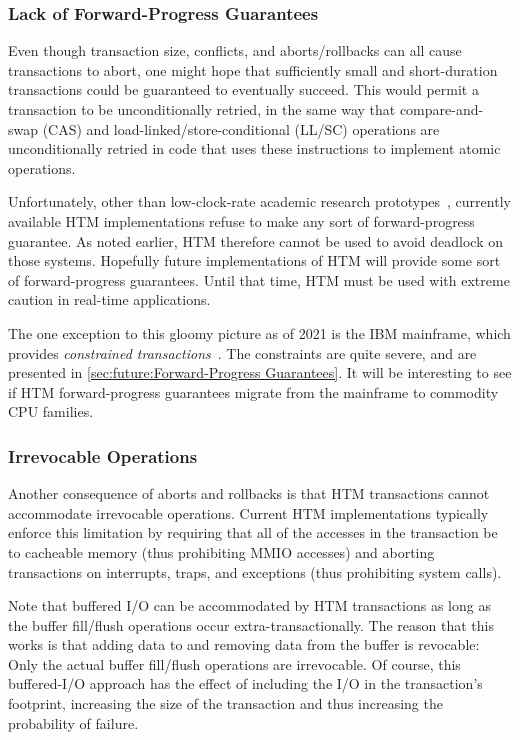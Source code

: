 \subsubsection{Lack of Forward-Progress Guarantees}
\label{sec:future:Lack of Forward-Progress Guarantees}

Even though transaction size, conflicts, and aborts/rollbacks can all
cause transactions to abort, one might hope that sufficiently small and
short-duration transactions could be guaranteed to eventually succeed.
This would permit a transaction to be unconditionally retried, in the
same way that compare-and-swap (CAS) and load-linked/store-conditional
(LL/SC) operations are unconditionally retried in code that uses these
instructions to implement atomic operations.

Unfortunately, other than low-clock-rate academic research
prototypes~\cite{MartinSchoeberl2010realtimeTM},
currently available HTM implementations refuse to make any
sort of forward-progress guarantee.
As noted earlier, HTM therefore cannot be used to avoid deadlock on
those systems.
Hopefully future implementations of HTM will provide some sort of
forward-progress guarantees.
Until that time, HTM must be used with extreme caution in real-time
applications.

The one exception to this gloomy picture as of 2021 is
the IBM mainframe, which provides
\emph{constrained transactions}~\cite{ChristianJacobi2012MainframeTM}.
The constraints are quite severe, and are presented in
\cref{sec:future:Forward-Progress Guarantees}.
It will be interesting to see if HTM forward-progress guarantees migrate
from the mainframe to commodity CPU families.

\subsubsection{Irrevocable Operations}
\label{sec:future:Irrevocable Operations}

Another consequence of aborts and rollbacks is that HTM transactions
cannot accommodate irrevocable operations.
Current HTM implementations typically enforce this limitation by
requiring that all of the accesses in the transaction be to cacheable
memory (thus prohibiting MMIO accesses) and aborting transactions on
interrupts, traps, and exceptions (thus prohibiting system calls).

Note that buffered I/O can be accommodated by HTM transactions as
long as the buffer fill/flush operations occur extra-transactionally.
The reason that this works is that adding data to and removing data
from the buffer is revocable: Only the actual buffer fill/flush
operations are irrevocable.
Of course, this buffered-I/O approach has the effect of including the I/O
in the transaction's footprint, increasing the size of the transaction
and thus increasing the probability of failure.

